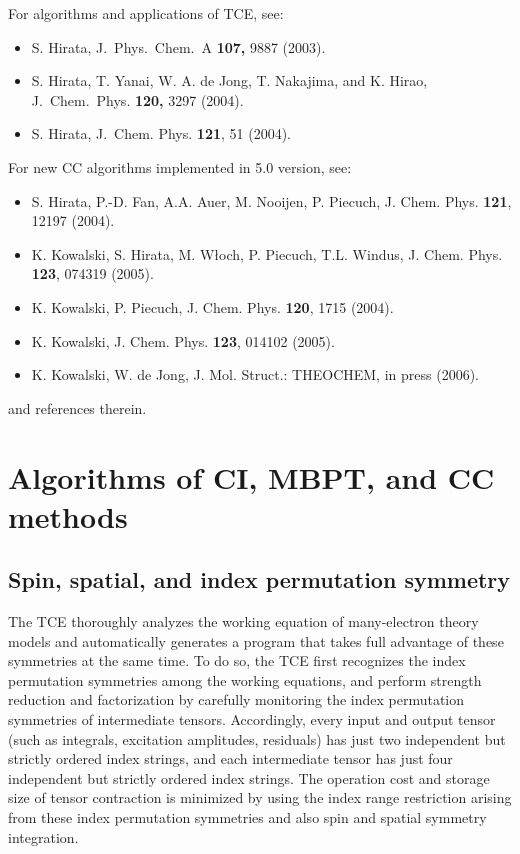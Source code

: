For algorithms and applications of TCE, see:
\begin{itemize}
\item S. Hirata, J.\ Phys.\ Chem.\ A {\bf 107,} 9887 (2003).
\item S. Hirata, T. Yanai, W. A. de Jong, T. Nakajima, and K. Hirao, J.\ Chem.\ Phys. {\bf 120,} 3297 (2004).
\item S. Hirata, J.\ Chem. Phys. {\bf 121}, 51 (2004).
\end{itemize}

For new CC algorithms implemented in 5.0 version, see:

\begin{itemize}
\item S. Hirata, P.-D. Fan, A.A. Auer, M. Nooijen, P. Piecuch, J. Chem. Phys.
{\bf 121}, 12197 (2004).
\item K. Kowalski, S. Hirata, M. W\l och, P. Piecuch, T.L. Windus, 
J. Chem. Phys. {\bf 123}, 074319 (2005).
\item K. Kowalski, P. Piecuch, J. Chem. Phys. {\bf 120},  1715 (2004).
\item K. Kowalski, J. Chem. Phys. {\bf 123}, 014102 (2005).
\item K. Kowalski, W. de Jong, J. Mol. Struct.: THEOCHEM, in press (2006).  
\end{itemize}
and references therein.

\section{Algorithms of CI, MBPT, and CC methods}

\subsection{Spin, spatial, and index permutation symmetry}

The TCE thoroughly analyzes the working equation of many-electron theory models and 
automatically generates a program that takes full advantage of these symmetries at the same time.
To do so, the TCE first recognizes the index permutation symmetries among the working equations,
and perform strength reduction and factorization by carefully monitoring the index permutation
symmetries of intermediate tensors.  Accordingly, every input and output tensor (such as 
integrals, excitation amplitudes, residuals) has just two independent but strictly ordered index strings,
and each intermediate tensor has just four independent but strictly ordered index strings.
The operation cost and storage size of tensor contraction is minimized by using the index range 
restriction arising from these
index permutation symmetries and also spin and spatial symmetry integration.

